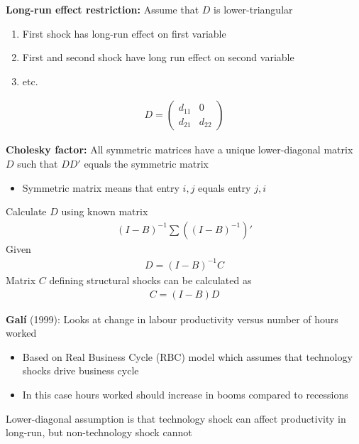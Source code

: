 \documentclass{beamer}
\begin{document}
\begin{frame}
\textbf{Long-run effect restriction:} Assume that $D$ is lower-triangular
\medskip  
  \begin{enumerate}
    \item First shock has long-run effect on first variable
    \item First and second shock have long run effect on second variable
    \item etc.
  \end{enumerate}
  \begin{align}
    D= \begin{pmatrix} d_{11} & 0 \\ d_{21} & d_{22} \end{pmatrix}
  \end{align}
\end{frame}

\begin{frame}
  \textbf{Cholesky factor:} All symmetric matrices have a unique lower-diagonal matrix $D$ such that $DD'$ equals the symmetric matrix
  \begin{itemize}
    \item Symmetric matrix means that entry $i,j$ equals entry $j,i$
  \end{itemize}
  \medskip
  Calculate $D$ using known matrix
  \begin{align}
    (I-B)^{-1}\sum \left( (I-B)^{-1} \right)'
  \end{align}
  Given 
  \begin{align}
    D=(I-B)^{-1}C
  \end{align}
  Matrix $C$ defining structural shocks can be calculated as  
  \begin{align}
    C=(I-B)D
  \end{align}
\end{frame}

\begin{frame}
  \textbf{Galí} (1999): Looks at change in labour productivity versus number of hours worked
  \begin{itemize}
    \item Based on Real Business Cycle (RBC) model which assumes that technology shocks drive business cycle
    \item In this case hours worked should increase in booms compared to recessions
  \end{itemize}
  \medskip
  Lower-diagonal assumption is that technology shock can affect productivity in long-run, but non-technology shock cannot
\end{frame}
\end{document}
